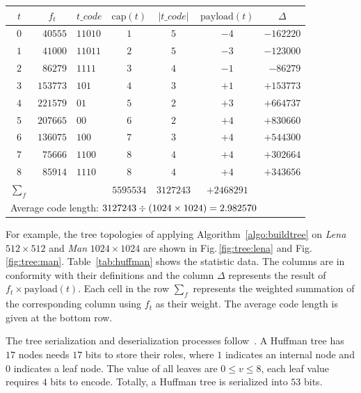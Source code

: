\documentclass[journal]{IEEEtran}
\begin{document}
\begin{table}[!t]
		
		\begin{tabular}{c@{\;}rl@{}c@{\;}c@{\;}c@{}r}
			\toprule 
			\(t\) &   
			\multicolumn{1}{c}{\(f_t\)} &     
			\multicolumn{1}{c}{\(t\_code\)}  &  
			\(\mathrm{cap}(t)\) &    
			\(\vert t\_code \vert\)    & 
			\(\mathrm{payload}(t)\)  & 
			\multicolumn{1}{c}{\(\Delta\)}  \\
			\midrule 
			$0$ & $40555$   & $11010$ & $1$ & $5$ & $-4$ & $-162220$  \\ 
			$1$ & $41000$   & $11011$ & $2$ & $5$ & $-3$ & $-123000$  \\ 
			$2$ & $86279$   & $1111$  & $3$ & $4$ & $-1$ & $-86279$   \\ 
			$3$ & $153773$  & $101$   & $4$ & $3$ & $+1$ & $+153773$  \\ 
			$4$ & $221579$  & $01$    & $5$ & $2$ & $+3$ & $+664737$  \\ 
			$5$ & $207665$  & $00$    & $6$ & $2$ & $+4$ & $+830660$  \\ 
			$6$ & $136075$  & $100$   & $7$ & $3$ & $+4$ & $+544300$  \\ 
			$7$ & $75666$   & $1100$  & $8$ & $4$ & $+4$ & $+302664$  \\ 
			$8$ & $85914$   & $1110$  & $8$ & $4$ & $+4$ & $+343656$  \\ 
			\midrule 
			$\sum_f$ &    && $5595534$ & $3127243$ &    $+2468291$ & \\ 
			\midrule
			\multicolumn{7}{l}{Average code length: \(3127243 \divisionsymbol (1024 \times 1024) = 2.982570\)} \\
			\bottomrule
		\end{tabular}
		\label{tab:huffman:man}
	\end{table}

	For example, the tree topologies of applying Algorithm~\ref{algo:buildtree} on \emph{Lena} \(512 \times 512\) and \emph{Man} \(1024 \times 1024\) are shown in Fig.\,\ref{fig:tree:lena} and Fig.\,\ref{fig:tree:man}. Table~\ref{tab:huffman} shows the statistic data. 
	The columns are in conformity with their definitions and the column \emph{\(\Delta\)} represents the result of \(f_t \times \mathrm{payload}(t)\). 
	Each cell in the row \emph{\(\sum_f\)} represents the weighted summation of the corresponding column using \(f_t\) as their weight.
	The average code length is given at the bottom row.
	
	The tree serialization and deserialization processes follow~\cite{Pu2006}.
	A Huffman tree has \(17\) nodes needs \(17\) bits to store their roles, where \(1\) indicates an internal node and \(0\) indicates a leaf node. 
	The value of all leaves are \(0 \leq v \leq 8\), each leaf value requires \(4\) bits to encode. 
	Totally, a Huffman tree is serialized into \(53\) bits.
	
\end{document}
